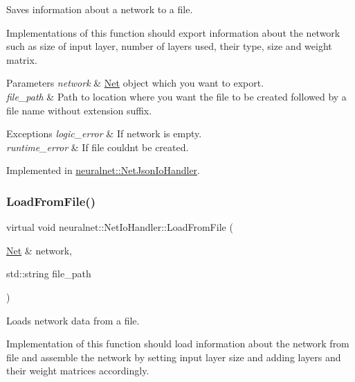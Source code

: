 Saves information about a network to a file. 

Implementations of this function should export information about the network such as size of input layer, number of layers used, their type, size and weight matrix.


\begin{DoxyParams}{Parameters}
{\em network} & \hyperlink{classneuralnet_1_1Net}{Net} object which you want to export. \\
\hline
{\em file\+\_\+path} & Path to location where you want the file to be created followed by a file name without extension suffix. \\
\hline
\end{DoxyParams}

\begin{DoxyExceptions}{Exceptions}
{\em logic\+\_\+error} & If network is empty. \\
\hline
{\em runtime\+\_\+error} & If file couldn\textquotesingle{}t be created. \\
\hline
\end{DoxyExceptions}


Implemented in \hyperlink{classneuralnet_1_1NetJsonIoHandler_a0e8c0b44b686498867ce83835d5811c2}{neuralnet\+::\+Net\+Json\+Io\+Handler}.

\mbox{\label{classneuralnet_1_1NetIoHandler_a9c6c5be1288e314c2affac7c939c52b5}} 
\subsubsection{\texorpdfstring{Load\+From\+File()}{LoadFromFile()}}
{\footnotesize\ttfamily virtual void neuralnet\+::\+Net\+Io\+Handler\+::\+Load\+From\+File (\begin{DoxyParamCaption}\item[{\hyperlink{classneuralnet_1_1Net}{Net} \&}]{network,  }\item[{std\+::string}]{file\+\_\+path }\end{DoxyParamCaption})\hspace{0.3cm}{\ttfamily [pure virtual]}}



Loads network data from a file. 

Implementation of this function should load information about the network from file and assemble the network by setting input layer size and adding layers and their weight matrices accordingly.


